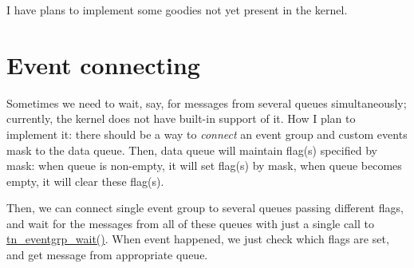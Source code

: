 I have plans to implement some goodies not yet present in the kernel.\hypertarget{plans_plans_event_connect}{}\section{Event connecting}\label{plans_plans_event_connect}
Sometimes we need to wait, say, for messages from several queues simultaneously; currently, the kernel does not have built-\/in support of it. How I plan to implement it\+: there should be a way to {\itshape connect} an event group and custom events mask to the data queue. Then, data queue will maintain flag(s) specified by mask\+: when queue is non-\/empty, it will set flag(s) by mask, when queue becomes empty, it will clear these flag(s).

Then, we can connect single event group to several queues passing different flags, and wait for the messages from all of these queues with just a single call to {\ttfamily \hyperlink{tn__eventgrp_8h_aa905d986d188d4a0cc2f3974aad04896}{tn\+\_\+eventgrp\+\_\+wait()}}. When event happened, we just check which flags are set, and get message from appropriate queue. 